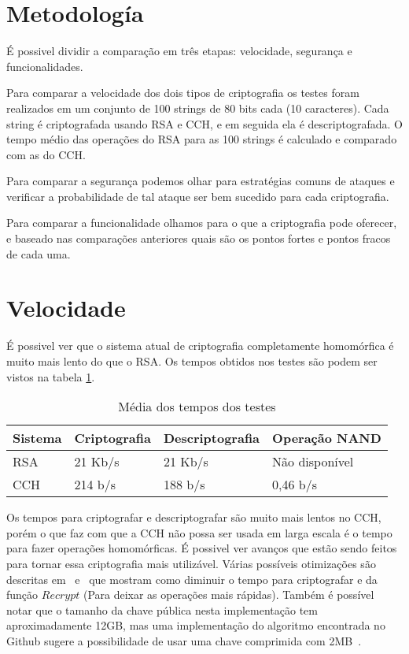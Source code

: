 \section{Metodología}
É possivel dividir a comparação em três etapas: velocidade, segurança e funcionalidades.

Para comparar a velocidade dos dois tipos de criptografia os testes foram realizados em um conjunto de 100 strings de 80 bits cada (10 caracteres). Cada string é criptografada usando RSA e CCH, e em seguida ela é descriptografada. O tempo médio das operações do RSA para as 100 strings é calculado e comparado com as do CCH.
	
Para comparar a segurança podemos olhar para estratégias comuns de ataques e verificar a probabilidade de tal ataque ser bem sucedido para cada criptografia.
	
Para comparar a funcionalidade olhamos para o que a criptografia pode oferecer, e baseado nas comparações anteriores quais são os pontos fortes e pontos fracos de cada uma.
	
\section{Velocidade}
É possivel ver que o sistema atual de criptografia completamente homomórfica é muito mais lento do que o RSA. Os tempos obtidos nos testes são podem ser vistos na tabela \ref{tab:LABEL_TAB_RESULTADOS}.
	
	\begin{table}[!h]
  	\centering
  	\begin{tabular}{ |l|l|l|l| }
    	\hline
      	Sistema & Criptografia & Descriptografia & Operação NAND \\
    	\hline
      	RSA & 21 Kb/s & 21 Kb/s & Não disponível \\
    	\hline
      	CCH & 214 b/s & 188 b/s & 0,46 b/s \\
    	\hline
  	\end{tabular}
  	\caption{Média dos tempos dos testes}
  	\label{tab:LABEL_TAB_RESULTADOS}
	\end{table}

	Os tempos para criptografar e descriptografar são muito mais lentos no CCH, porém o que faz com que a CCH não possa ser usada em larga escala é o tempo para fazer operações homomórficas. É possivel ver avanços que estão sendo feitos para tornar essa criptografia mais utilizável. Várias possíveis otimizações são descritas em~\cite{optone} e~\cite{opttwo} que mostram como diminuir o tempo para criptografar e da função $Recrypt$ (Para deixar as operações mais rápidas). Também é possível notar que o tamanho da chave pública nesta implementação tem aproximadamente 12GB, mas uma implementação do algoritmo encontrada no Github sugere a possibilidade de usar uma chave comprimida com 2MB~\cite{coron}.
	
